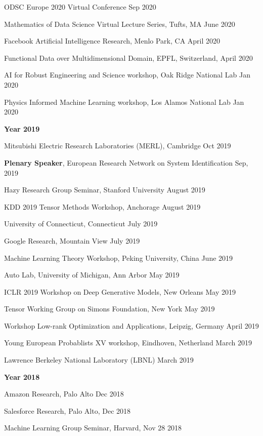 \documentclass[margin,line]{res}
\begin{document}
\begin{resume}
 
 ODSC Europe 2020 Virtual Conference \hfill{Sep 2020}

 
 Mathematics of Data Science Virtual Lecture Series, Tufts, MA \hfill{June 2020}
 
 
Facebook Artificial Intelligence Research,  Menlo Park, CA \hfill{April 2020}


 Functional Data over Multidimensional Domain, EPFL, Switzerland,   \hfill{April 2020}
 
 
AI for Robust Engineering and Science workshop,  Oak Ridge National Lab \hfill{Jan 2020}
 
 
Physics Informed Machine Learning workshop,  Los Alamos National Lab \hfill {Jan 2020}


 {\bf Year  2019}
 

Mitsubishi Electric Research Laboratories (MERL), Cambridge  \hfill {Oct  2019}


\textbf{Plenary Speaker},  European Research Network on System Identification   \hfill {Sep, 2019}


Hazy Research Group Seminar,  Stanford University  \hfill {August 2019}

KDD 2019 Tensor Methods Workshop, Anchorage \hfill{August 2019}

University  of Connecticut,   Connecticut \hfill{July 2019}

Google  Research, Mountain View \hfill{July 2019}

Machine Learning Theory Workshop,  Peking University, China  \hfill{June 2019}

Auto Lab, University of Michigan, Ann Arbor  \hfill{May 2019}

ICLR 2019 Workshop on Deep Generative Models, New Orleans  \hfill{May 2019}

Tensor Working Group  on Simons Foundation, New York  \hfill{May  2019}

Workshop Low-rank Optimization and Applications,  Leipzig, Germany \hfill{April 2019}

 Young European Probablists XV workshop, Eindhoven, Netherland  \hfill{March 2019}
 
 Lawrence Berkeley National Laboratory (LBNL) \hfill{March 2019}

 {\bf Year  2018}
 
Amazon Research, Palo Alto \hfill{Dec 2018}

Salesforce Research, Palo Alto, \hfill{Dec 2018}

Machine Learning Group Seminar, Harvard, \hfill {Nov 28 2018} 


\end{resume}
\end{document}
